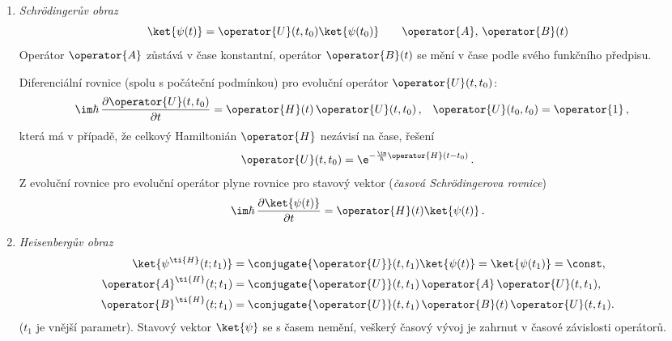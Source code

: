 \begin{enumerate}
\item
    \emph{Schrödingerův obraz}
    \begin{equation}
        \ket{\psi(t)}
            =\operator{U}(t,t_{0})\ket{\psi(t_{0})}\qquad\operator{A},\,\operator{B}(t)
    \end{equation}
    Operátor $\operator{A}$ zůstává v čase konstantní, 
    operátor $\operator{B}(t)$ se mění v čase podle svého funkčního předpisu.
    
    Diferenciální rovnice (spolu s počáteční podmínkou) pro evoluční operátor $\operator{U}(t,t_{0})$:
    \begin{align}
        \im\hbar\,\frac{\partial\operator{U}(t,t_{0})}{\partial t}
            &=\operator{H}(t)\,\operator{U}(t,t_{0})\,,
            &\operator{U}(t_{0},t_{0})
            &=\operator{1}\,,
    \end{align}
    která má v případě, že celkový Hamiltonián $\operator{H}$ nezávisí na čase, řešení
    \begin{equation}
        \operator{U}(t,t_{0})
            =\e^{-\frac{\im}{\hbar}\operator{H}(t-t_{0})}\,.
    \end{equation}
    Z evoluční rovnice pro evoluční operátor plyne rovnice pro stavový vektor (\emph{časová Schrödingerova rovnice})
    \begin{equation}
        \im\hbar\,\frac{\partial\ket{\psi(t)}}{\partial t}
            =\operator{H}(t)\ket{\psi(t)}\,.
    \end{equation}

\item\emph{Heisenbergův obraz}
    \begin{subequations}
        \begin{align}
            \ket{\psi^{\ti{H}}(t;t_{1})}
                &=\conjugate{\operator{U}}(t,t_{1})\ket{\psi(t)}
                    =\ket{\psi(t_{1})}
                    =\const,\\
            \operator{A}^{\ti{H}}(t;t_{1})
                &=\conjugate{\operator{U}}(t,t_{1})\,\operator{A}\,\operator{U}(t,t_{1}),\\
            \operator{B}^{\ti{H}}(t;t_{1})
                &=\conjugate{\operator{U}}(t,t_{1})\,\operator{B}(t)\,\operator{U}(t,t_{1}).
        \end{align}            
    \end{subequations}
    ($t_{1}$ je vnější parametr).
    Stavový vektor $\ket{\psi}$ se s časem nemění, veškerý časový vývoj je zahrnut v časové závislosti operátorů.
    

\end{enumerate}
